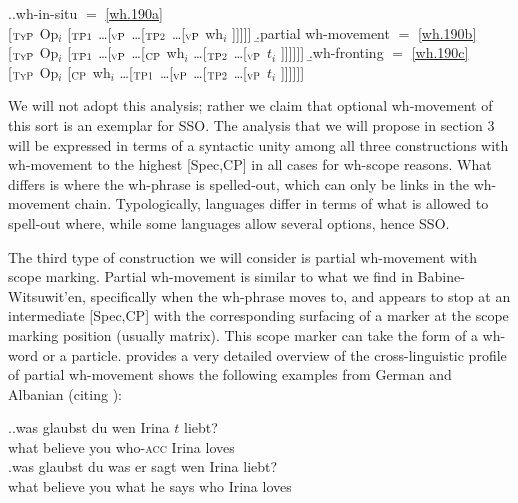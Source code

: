 \documentclass[11pt]{article}
\begin{document}
\ex.\a.\label{wh.240a}wh-in-situ $=$ \ref{wh.190a}\\{}[$_{\textsc{TyP}}$ Op$_i$ [$_{\textsc{TP1}}$ \dots [$_{\textsc{vP}}$ \dots [$_{\textsc{TP2}}$ \dots [$_{\textsc{vP}}$ wh$_i$ ]]]]]\hspace{\fill}
   \b.\label{wh.240b}partial wh-movement $=$ \ref{wh.190b}\\{}[$_{\textsc{TyP}}$ Op$_i$ [$_{\textsc{TP1}}$ \dots [$_{\textsc{vP}}$ \dots [$_{\textsc{CP}}$ wh$_i$ \dots [$_{\textsc{TP2}}$ \dots [$_{\textsc{vP}}$ $t_i$ ]]]]]]\hspace{\fill}
   \b.\label{wh.240c}wh-fronting $=$ \ref{wh.190c}\\{}[$_{\textsc{TyP}}$ Op$_i$ [$_{\textsc{CP}}$ wh$_i$ \dots [$_{\textsc{TP1}}$ \dots [$_{\textsc{vP}}$ \dots [$_{\textsc{TP2}}$ \dots [$_{\textsc{vP}}$ $t_i$ ]]]]]]\hspace{\fill}\hspace{\fill}

We will not adopt this analysis; rather we claim that optional wh-movement of this sort is an exemplar for SSO. The analysis that we will propose in section 3 will be expressed in terms of a syntactic unity among all three constructions with wh-movement to the highest [Spec,CP] in all cases for wh-scope reasons. What differs is where the wh-phrase is spelled-out, which can only be links in the wh-movement chain. Typologically, languages differ in terms of what is allowed to spell-out where, while some languages allow several options, hence SSO.

The third type of construction we will consider is partial wh-movement with scope marking. Partial wh-movement is similar to what we find in Babine-Witsuwit'en, specifically when the wh-phrase moves to, and appears to stop at an intermediate [Spec,CP] with the corresponding surfacing of a marker at the scope marking position (usually matrix). This scope marker can take the form of a wh-word or a particle. \cite{fanselow:2006} provides a very detailed overview of the cross-linguistic profile of partial wh-movement shows the following examples from German and Albanian (citing \citealp{turano:1995}):

\ex.\label{wh.250}\ag.\label{wh.250a}was glaubst du wen Irina $t$ liebt?\\
   what believe you who-\textsc{acc} Irina {} loves\\
   \bg.\label{wh.250b}was glaubst du was er sagt wen Irina liebt?\\
   what believe you what he says who Irina loves\\
\end{document}
